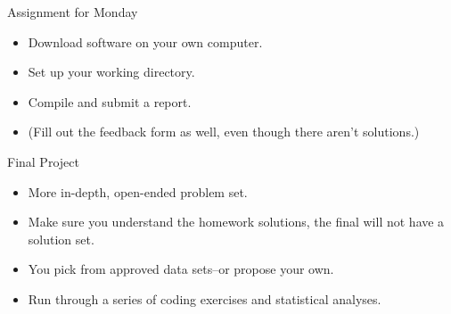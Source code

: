\documentclass[xcolor={dvipsnames}]{beamer}
\begin{document}



\begin{frame}{Assignment for Monday}

\begin{itemize}
\item Download software on your own computer. \pause
\item Set up your working directory. \pause
\item Compile and submit a report.\pause
\item (Fill out the feedback form as well, even though there aren't solutions.) 
\end{itemize}

\end{frame}



\begin{frame}{Final Project}

\pause
\begin{itemize}
\item More in-depth, open-ended problem set. \pause
\item Make sure you understand the homework solutions, the final will not have a solution set. \pause
\item You pick from approved data sets--or propose your own. \pause
\item Run through a series of coding exercises and statistical analyses. 
\end{itemize}

\end{frame}


\end{document}

